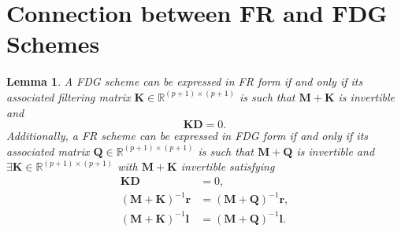 \documentclass[preprint,12pt]{elsarticle}
\newtheorem{lemma}{Lemma}
\begin{document}
\section{Connection between FR and FDG Schemes}
\label{app1}
\begin{lemma}
\label{lem:equivalence}
    A FDG scheme can be expressed in FR form if and only if its associated filtering matrix $\mathbf{K} \in \mathbb{R}^{(p+1) \times (p+1)}$ is such that $\mathbf{M} + \mathbf{K}$ is invertible and
    \begin{equation}
        \mathbf{K}\mathbf{D} = 0.
    \end{equation}
    Additionally, a FR scheme can be expressed in FDG form if and only if its associated matrix $\mathbf{Q} \in \mathbb{R}^{(p+1) \times (p+1)}$ is such that $\mathbf{M} + \mathbf{Q}$ is invertible and $\exists \mathbf{K} \in \mathbb{R}^{(p+1) \times (p+1)}$ with $\mathbf{M} + \mathbf{K}$ invertible satisfying
    \begin{align}
    \mathbf{K}\mathbf{D} &= 0, \\
    (\mathbf{M} + \mathbf{K})^{-1} \mathbf{r} &= (\mathbf{M} + \mathbf{Q})^{-1} \mathbf{r},\\
    (\mathbf{M} + \mathbf{K})^{-1} \mathbf{l} &= (\mathbf{M} + \mathbf{Q})^{-1} \mathbf{l}.
\end{align}
\end{lemma}
\end{document}
